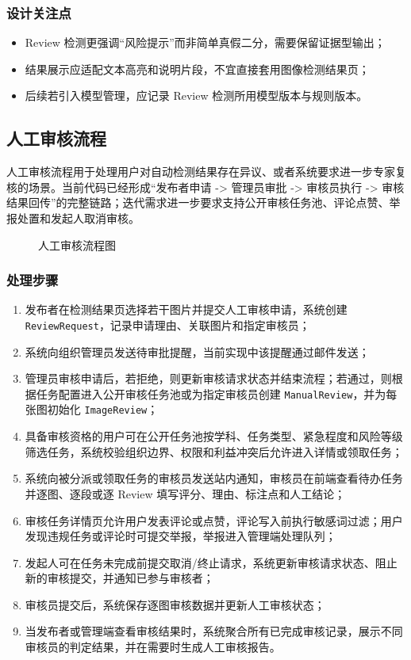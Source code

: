 \subsubsection{设计关注点}
\begin{itemize}[leftmargin=2em]
    \item Review 检测更强调“风险提示”而非简单真假二分，需要保留证据型输出；
    \item 结果展示应适配文本高亮和说明片段，不宜直接套用图像检测结果页；
    \item 后续若引入模型管理，应记录 Review 检测所用模型版本与规则版本。
\end{itemize}

\subsection{人工审核流程}
人工审核流程用于处理用户对自动检测结果存在异议、或者系统要求进一步专家复核的场景。当前代码已经形成“发布者申请 -> 管理员审批 -> 审核员执行 -> 审核结果回传”的完整链路；迭代需求进一步要求支持公开审核任务池、评论点赞、举报处置和发起人取消审核。

\begin{figure}[H]
    \centering
    \resizebox{0.98\textwidth}{!}{}
    \caption{人工审核流程图}
\end{figure}

\subsubsection{处理步骤}
\begin{enumerate}[leftmargin=2em]
    \item 发布者在检测结果页选择若干图片并提交人工审核申请，系统创建 \texttt{ReviewRequest}，记录申请理由、关联图片和指定审核员；
    \item 系统向组织管理员发送待审批提醒，当前实现中该提醒通过邮件发送；
    \item 管理员审核申请后，若拒绝，则更新审核请求状态并结束流程；若通过，则根据任务配置进入公开审核任务池或为指定审核员创建 \texttt{ManualReview}，并为每张图初始化 \texttt{ImageReview}；
    \item 具备审核资格的用户可在公开任务池按学科、任务类型、紧急程度和风险等级筛选任务，系统校验组织边界、权限和利益冲突后允许进入详情或领取任务；
    \item 系统向被分派或领取任务的审核员发送站内通知，审核员在前端查看待办任务并逐图、逐段或逐 Review 填写评分、理由、标注点和人工结论；
    \item 审核任务详情页允许用户发表评论或点赞，评论写入前执行敏感词过滤；用户发现违规任务或评论时可提交举报，举报进入管理端处理队列；
    \item 发起人可在任务未完成前提交取消/终止请求，系统更新审核请求状态、阻止新的审核提交，并通知已参与审核者；
    \item 审核员提交后，系统保存逐图审核数据并更新人工审核状态；
    \item 当发布者或管理端查看审核结果时，系统聚合所有已完成审核记录，展示不同审核员的判定结果，并在需要时生成人工审核报告。
\end{enumerate}

